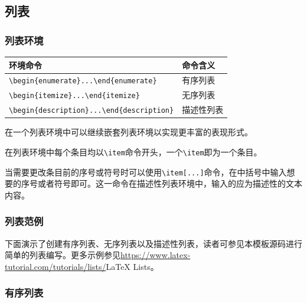 {\begin{longtable}{ccccccccc}
  \end{longtable}
}

\subsection{列表}

\subsubsection{列表环境}

\begin{tabular}{l l}
\toprule
环境命令 & 命令含义\\
\midrule
\verb|\begin{enumerate}...\end{enumerate}| & 有序列表 \\
\verb|\begin{itemize}...\end{itemize}| & 无序列表 \\
\verb|\begin{description}...\end{description}| & 描述性列表 \\
\bottomrule
\end{tabular}

在一个列表环境中可以继续嵌套列表环境以实现更丰富的表现形式。

在列表环境中每个条目均以\verb|\item|命令开头，一个\verb|\item|即为一个条目。

当需要更改条目前的序号或符号时可以使用\verb|\item[...]|命令，在中括号中输入想要的序号或者符号即可。这一命令在描述性列表环境中，输入的应为描述性的文本内容。

\subsubsection{列表范例}

下面演示了创建有序列表、无序列表以及描述性列表，读者可参见本模板源码进行简单的列表编写。更多示例参见\href{https://www.latex-tutorial.com/tutorials/lists/}{https://www.latex-tutorial.com/tutorials/lists/}{LaTeX Lists}。

\subsubsection{有序列表}

